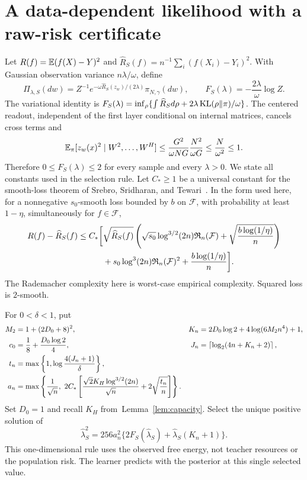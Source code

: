 \section{A data-dependent likelihood with a raw-risk certificate}
Let $R(f)=\mathbb E(f(X)-Y)^2$ and $\widehat R_S(f)=n^{-1}\sum_i(f(X_i)-Y_i)^2$. With Gaussian observation variance $n\lambda/\omega$, define
\[
 \Pi_{\lambda,S}(dw)=Z^{-1}e^{-\omega\widehat R_S(z_w)/(2\lambda)}\pi_{N,\gamma}(dw),\qquad
 F_S(\lambda)=-\frac{2\lambda}{\omega}\log Z.
\]
The variational identity is $F_S(\lambda)=\inf_\rho\{\int\widehat R_Sd\rho+2\lambda\operatorname{KL}(\rho\|\pi)/\omega\}$. The centered readout, independent of the first layer conditional on internal matrices, cancels cross terms and
\[
 \mathbb E_\pi[z_w(x)^2\mid W^2,\ldots,W^H]\le\frac{G^2}{\omega NG}\frac{N^2}{\omega G}
                 \le\frac N{\omega^2}\le1.
\]
Therefore $0\le F_S(\lambda)\le2$ for every sample and every $\lambda>0$.
We state all constants used in the selection rule. Let $C_*\ge1$ be a universal constant for the smooth-loss theorem of Srebro, Sridharan, and Tewari~\cite[Theorem~1]{sst}. In the form used here, for a nonnegative $s_0$-smooth loss bounded by $b$ on $\mathcal F$, with probability at least $1-\eta$, simultaneously for $f\in\mathcal F$,
\begin{align}
 R(f)-\widehat R_S(f)\le C_*\bigg[&\sqrt{\widehat R_S(f)}
 \left(\sqrt{s_0}\log^{3/2}(2n)\mathfrak R_n(\mathcal F)+\sqrt{\frac{b\log(1/\eta)}n}\right)\notag\\
 &+s_0\log^3(2n)\mathfrak R_n(\mathcal F)^2+\frac{b\log(1/\eta)}n\bigg].
 \label{eq:sst}
\end{align}
The Rademacher complexity here is worst-case empirical complexity. Squared loss is $2$-smooth.

For $0<\delta<1$, put
\begin{align}
 M_2&=1+(2D_0+8)^2, & K_n&=2D_0\log2+4\log(6M_2n^4)+1,\notag\\
 c_0&=\frac18+\frac{D_0\log2}{4}, &
 J_n&=\left\lceil\log_2(4n+K_n+2)\right\rceil,\notag\\
 t_n&=\max\left\{1,\log\frac{4(J_n+1)}\delta\right\},\notag\\
 a_n&=\max\left\{\frac1{\sqrt n},\ 2C_*\left[
       \frac{\sqrt2K_H\log^{3/2}(2n)}{\sqrt n}+2\sqrt{\frac{t_n}n}\right]\right\}.
 \label{eq:stat-constants}
\end{align}
Set $D_0=1$ and recall $K_H$ from~Lemma~\ref{lem:capacity}. Select the unique positive solution of
\begin{equation}
 \widehat\lambda_S^2
   =256a_n^2\{2F_S(\widehat\lambda_S)+\widehat\lambda_S(K_n+1)\}.
 \label{eq:calibration}
\end{equation}
This one-dimensional rule uses the observed free energy, not teacher resources or the population risk. The learner predicts with the posterior at this single selected value.

